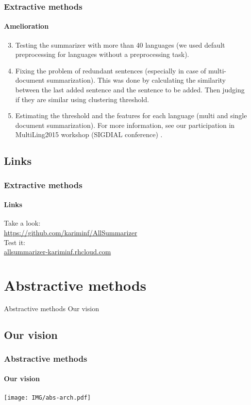\documentclass{beamer}
\begin{document}
\begin{frame}
\frametitle{Extractive methods}
\framesubtitle{Amelioration}

\begin{enumerate}
\setcounter{enumi}{2}

\item Testing the summarizer with more than 40 languages (we used default preprocessing for languages without a preprocessing task).

\item Fixing the problem of redundant sentences (especially in case of multi-document summarization). 
This was done by calculating the similarity between the last added sentence and the sentence to be added. 
Then judging if they are similar using clustering threshold.

\item Estimating the threshold and the features for each language (multi and single document summarization). 
For more information, see our participation in MultiLing2015 workshop (SIGDIAL conference) \cite{15-aries-al}.

\end{enumerate}

\end{frame}

\subsection{Links}
\begin{frame}
\frametitle{Extractive methods}
\framesubtitle{Links}

Take a look: \\
\url{https://github.com/kariminf/AllSummarizer} \\
\vfill
Test it: \\
\url{allsummarizer-kariminf.rhcloud.com} 

\end{frame}

\section{Abstractive methods}

\begin{frame}
\begin{center}
{\Huge Abstractive methods}
\vfill
{\Huge Our vision}
\end{center}
\end{frame}

\subsection{Our vision}
\begin{frame}
\frametitle{Abstractive methods}
\framesubtitle{Our vision}

\begin{center}
\texttt{[image: IMG/abs-arch.pdf]}
\end{center}

\end{frame}
\end{document}
